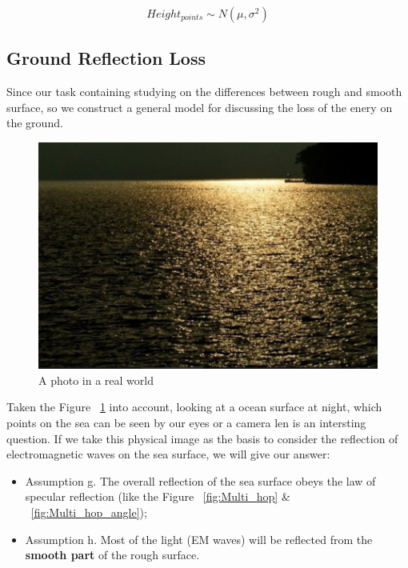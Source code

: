 \documentclass{mcmthesis}
\begin{document}
    \begin{equation}\label{eq:Height_Gaussian}
      Height_{points} \sim N(\mu,\sigma^2)
    \end{equation}


  \subsection{Ground Reflection Loss}
    Since our task containing studying on the differences between rough and smooth surface, so we construct a general model for discussing the loss of the enery on the ground.

    \begin{figure}[h]
    \centering
    \includegraphics[scale=0.6]{waterface}
    \caption{A photo in a real world}
    \label{fig:waterface}
    \end{figure}

    Taken the Figure ~\ref{fig:waterface} into account, looking at a ocean surface at night, which points on the sea can be seen by our eyes or a camera len is an intersting question. If we take this physical image as the basis to consider the reflection of electromagnetic waves on the sea surface, we will give our answer:

    \begin{itemize}
      \item Assumption g. The overall reflection of the sea surface obeys the law of specular reflection (like the Figure ~\ref{fig:Multi_hop} \& ~\ref{fig:Multi_hop_angle}); \\
      \item Assumption h. Most of the light (EM waves) will be reflected from the \textbf{smooth part} of the rough surface. \\
    \end{itemize}
\end{document}
